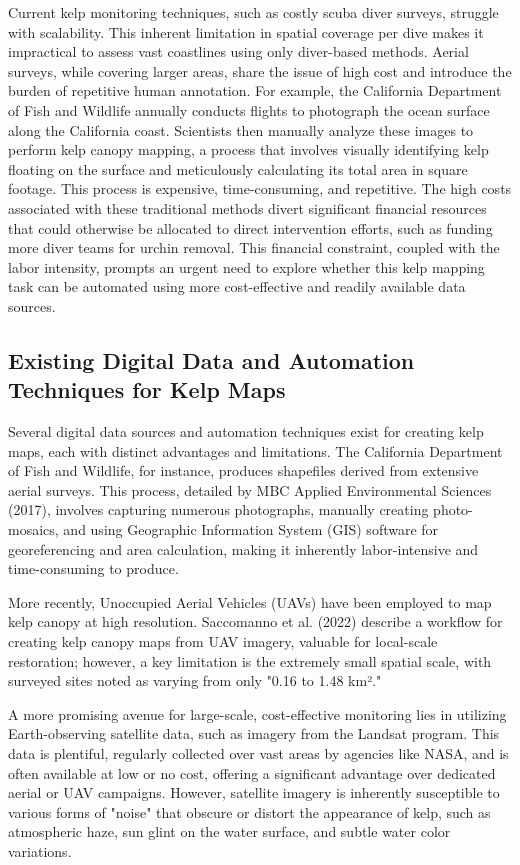 \documentclass{article}
\begin{document}
Current kelp monitoring techniques, such as costly scuba diver surveys, struggle with scalability. This inherent limitation in spatial coverage per dive makes it impractical to assess vast coastlines using only diver-based methods. Aerial surveys, while covering larger areas, share the issue of high cost and introduce the burden of repetitive human annotation. For example, the California Department of Fish and Wildlife annually conducts flights to photograph the ocean surface along the California coast. Scientists then manually analyze these images to perform kelp canopy mapping, a process that involves visually identifying kelp floating on the surface and meticulously calculating its total area in square footage. This process is expensive, time-consuming, and repetitive. The high costs associated with these traditional methods divert significant financial resources that could otherwise be allocated to direct intervention efforts, such as funding more diver teams for urchin removal. This financial constraint, coupled with the labor intensity, prompts an urgent need to explore whether this kelp mapping task can be automated using more cost-effective and readily available data sources.

\subsection{Existing Digital Data and Automation Techniques for Kelp Maps} 

Several digital data sources and automation techniques exist for creating kelp maps, each with distinct advantages and limitations. The California Department of Fish and Wildlife, for instance, produces shapefiles derived from extensive aerial surveys. This process, detailed by MBC Applied Environmental Sciences (2017), involves capturing numerous photographs, manually creating photo-mosaics, and  using Geographic Information System (GIS) software for georeferencing and area calculation, making it inherently labor-intensive and time-consuming to produce.

More recently, Unoccupied Aerial Vehicles (UAVs) have been employed to map kelp canopy at high resolution. Saccomanno et al. (2022) describe a workflow for creating kelp canopy maps from UAV imagery, valuable for local-scale restoration; however, a key limitation is the extremely small spatial scale, with surveyed sites noted as varying from only "0.16 to 1.48 km²."

A more promising avenue for large-scale, cost-effective monitoring lies in utilizing Earth-observing satellite data, such as imagery from the Landsat program. This data is plentiful, regularly collected over vast areas by agencies like NASA, and is often available at low or no cost, offering a significant advantage over dedicated aerial or UAV campaigns. However, satellite imagery is inherently susceptible to various forms of "noise" that obscure or distort the appearance of kelp, such as atmospheric haze, sun glint on the water surface, and subtle water color variations. 
\end{document}

